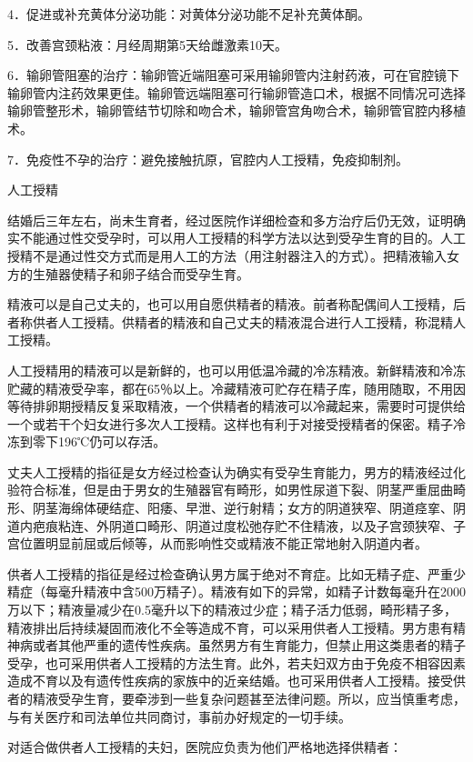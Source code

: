 \documentclass[12pt,UTF8,openany]{ctexbook}
\begin{document}
4．促进或补充黄体分泌功能：对黄体分泌功能不足补充黄体酮。

5．改善宫颈粘液：月经周期第5天给雌激素10天。

6．输卵管阻塞的治疗：输卵管近端阻塞可采用输卵管内注射药液，可在官腔镜下输卵管内注药效果更佳。输卵管远端阻塞可行输卵管造口术，根据不同情况可选择输卵管整形术，输卵管结节切除和吻合术，输卵管宫角吻合术，输卵管官腔内移植术。

7．免疫性不孕的治疗：避免接触抗原，官腔内人工授精，免疫抑制剂。

人工授精

结婚后三年左右，尚未生育者，经过医院作详细检查和多方治疗后仍无效，证明确实不能通过性交受孕时，可以用人工授精的科学方法以达到受孕生育的目的。人工授精不是通过性交方式而是用人工的方法（用注射器注入的方式）。把精液输入女方的生殖器使精子和卵子结合而受孕生育。

精液可以是自己丈夫的，也可以用自愿供精者的精液。前者称配偶间人工授精，后者称供者人工授精。供精者的精液和自己丈夫的精液混合进行人工授精，称混精人工授精。

人工授精用的精液可以是新鲜的，也可以用低温冷藏的冷冻精液。新鲜精液和冷冻贮藏的精液受孕率，都在65％以上。冷藏精液可贮存在精子库，随用随取，不用因等待排卵期授精反复采取精液，一个供精者的精液可以冷藏起来，需要时可提供给一个或若干个妇女进行多次人工授精。这样也有利于对接受授精者的保密。精子冷冻到零下196℃仍可以存活。

丈夫人工授精的指征是女方经过检查认为确实有受孕生育能力，男方的精液经过化验符合标准，但是由于男女的生殖器官有畸形，如男性尿道下裂、阴茎严重屈曲畸形、阴茎海绵体硬结症、阳痿、早泄、逆行射精；女方的阴道狭窄、阴道痉挛、阴道内疤痕粘连、外阴道口畸形、阴道过度松弛存贮不住精液，以及子宫颈狭窄、子宫位置明显前屈或后倾等，从而影响性交或精液不能正常地射入阴道内者。

供者人工授精的指征是经过检查确认男方属于绝对不育症。比如无精子症、严重少精症（每毫升精液中含500万精子）。精液有如下的异常，如精子计数每毫升在2000万以下；精液量减少在0.5毫升以下的精液过少症；精子活力低弱，畸形精子多，精液排出后持续凝固而液化不全等造成不育，可以采用供者人工授精。男方患有精神病或者其他严重的遗传性疾病。虽然男方有生育能力，但禁止用这类患者的精子受孕，也可采用供者人工授精的方法生育。此外，若夫妇双方由于免疫不相容因素造成不育以及有遗传性疾病的家族中的近亲结婚。也可采用供者人工授精。接受供者的精液受孕生育，要牵涉到一些复杂问题甚至法律问题。所以，应当慎重考虑，与有关医疗和司法单位共同商讨，事前办好规定的一切手续。

对适合做供者人工授精的夫妇，医院应负责为他们严格地选择供精者：
\end{document}
